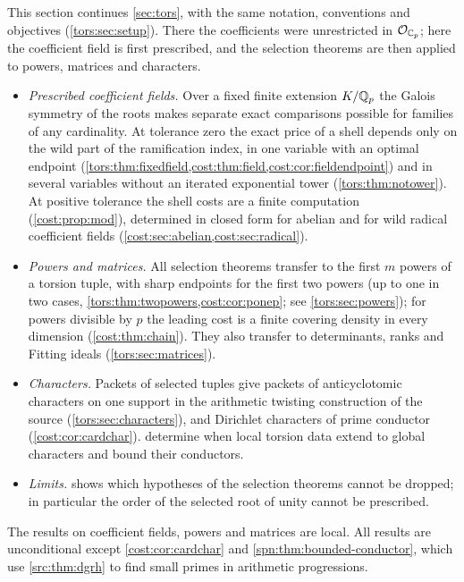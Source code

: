 This section continues \cref{sec:tors}, with the same notation, conventions and objectives
(\cref{tors:sec:setup}). There the coefficients were unrestricted in $\mathcal{O}_{\mathbb{C}_p}$; here the
coefficient field is first prescribed, and the selection theorems are then applied to
powers, matrices and characters.
\begin{itemize}
\item \emph{Prescribed coefficient fields.} Over a fixed finite extension $K/\mathbb{Q}_p$ the
  Galois symmetry of the roots makes separate exact comparisons possible for families of
  any cardinality. At tolerance zero the exact price of a shell depends only on the wild
  part of the ramification index, in one variable with an optimal endpoint
  (\cref{tors:thm:fixedfield,cost:thm:field,cost:cor:fieldendpoint}) and in several
  variables without an iterated exponential tower (\cref{tors:thm:notower}). At positive
  tolerance the shell costs are a finite computation (\cref{cost:prop:mod}), determined in
  closed form for abelian and for wild radical coefficient fields
  (\cref{cost:sec:abelian,cost:sec:radical}).
\item \emph{Powers and matrices.} All selection theorems transfer to the first $m$ powers
  of a torsion tuple, with sharp endpoints for the first two powers (up to one in two
  cases, \cref{tors:thm:twopowers,cost:cor:ponep}; see \cref{tors:sec:powers}); for powers
  divisible by $p$ the leading cost is a finite covering density in every dimension
  (\cref{cost:thm:chain}). They also transfer to determinants, ranks and Fitting ideals
  (\cref{tors:sec:matrices}).
\item \emph{Characters.} Packets of selected tuples give packets of anticyclotomic
  characters on one support in the arithmetic twisting construction of the source
  (\cref{tors:sec:characters}), and Dirichlet characters of prime conductor
  (\cref{cost:cor:cardchar}). 
  determine when local torsion data extend to global characters and bound their
  conductors.
\item \emph{Limits.}  shows which hypotheses of the selection
  theorems cannot be dropped; in particular the order of the selected root of unity
  cannot be prescribed.
\end{itemize}
The results on coefficient fields, powers and matrices are local. All results are
unconditional except \cref{cost:cor:cardchar} and \cref{spn:thm:bounded-conductor}, which
use \cref{src:thm:dgrh} to find small primes in arithmetic progressions.



